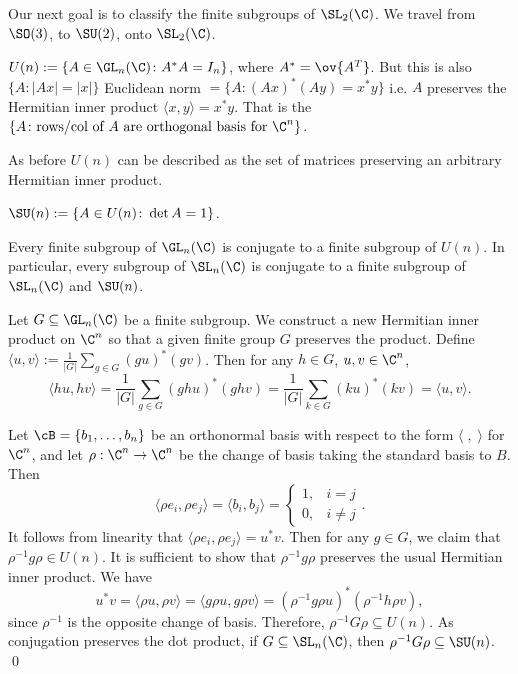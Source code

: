Our next goal is to classify the finite subgroups of $\SL_2(\C)$. We travel from $\SO(3)$, to $\SU(2)$, onto $\SL_2(\C)$. 

\begin{dfn}
$U(n):= \{A \in \GL_n(\C) \colon A^*A=I_n\}$, where $A^*=\ov{A^T}$. But this is also $\{A \colon |Ax|=|x|\}$ Euclidean norm $=\{ A \colon (Ax)^*(Ay)=x^*y\}$ i.e. $A$ preserves the Hermitian inner product $\langle x,y \rangle = x^*y$. That is the $\{A \colon \text{rows/col of }A \text{ are orthogonal basis for }\C^n\}$. 
\end{dfn}

As before $U(n)$ can be described as the set of matrices preserving an arbitrary Hermitian inner product. 

\begin{dfn}
$\SU(n):=\{A \in U(n) \colon \det A=1\}$. 
\end{dfn}








\begin{lem}
Every finite subgroup of $\GL_n(\C)$ is conjugate to a finite subgroup of $U(n)$. In particular, every subgroup of $\SL_n(\C)$ is conjugate to a finite subgroup of $\SL_n(\C)$ and $\SU(n)$. 
\end{lem}

\pf Let $G \subseteq \GL_n(\C)$ be a finite subgroup. We construct a new Hermitian inner product on $\C^n$ so that a given finite group $G$ preserves the product. Define $\langle u,v \rangle:= \frac{1}{|G|} \sum_{g \in G} (gu)^*(gv)$. Then for any $h \in G$, $u,v \in \C^n$,
	\[
	\langle hu,hv \rangle= \frac{1}{|G|} \sum_{g \in G} (ghu)^*(ghv)= \frac{1}{|G|} \sum_{k \in G} (ku)^*(kv)=\langle u,v \rangle. 
	\]




Let $\cB=\{b_1,\ldots,b_n\}$ be an orthonormal basis with respect to the form $\langle \;,\;\rangle$ for $\C^n$, and let $\rho: \C^n \to \C^n$ be the change of basis taking the standard basis to $B$. Then 
	\[
	\langle \rho e_i,\rho e_j \rangle= \langle b_i,b_j\rangle = \begin{cases} 1, & i=j \\ 0, & i\neq j \end{cases}.
	\]
It follows from linearity that $\langle \rho e_i,\rho e_j \rangle= u^*v$. Then for any $g \in G$, we claim that $\rho^{-1}g \rho \in U(n)$. It is sufficient to show that $\rho^{-1}g\rho$ preserves the usual Hermitian inner product. We have
	\[
	u^*v= \langle \rho u, \rho v \rangle= \langle g\rho u, g\rho v \rangle = (\rho^{-1}g\rho u)^* (\rho^{-1}h\rho v),
	\]
since $\rho^{-1}$ is the opposite change of basis. Therefore, $\rho^{-1} G \rho \subseteq U(n)$. As conjugation preserves the dot product, if $G \subseteq \SL_n(\C)$, then $\rho^{-1}G\rho \subseteq \SU(n)$. \qed \\


